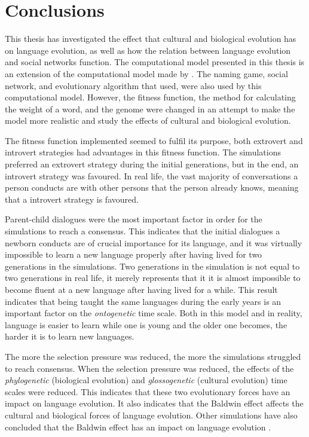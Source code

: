 \acresetall
\chapter{Conclusions}\label{ch:Conclusion}

This thesis has investigated the effect that cultural and biological evolution has on language evolution, as well as how the relation between language evolution and social networks function. The computational model presented in this thesis is an extension of the computational model made by \citet{lekvam2014co}. The naming game, social network, and evolutionary algorithm that \citeauthor{lekvam2014co} used, were also used by this computational model. However, the fitness function, the method for calculating the weight of a word, and the genome were changed in an attempt to make the model more realistic and study the effects of cultural and biological evolution.
 
The fitness function implemented seemed to fulfil its purpose, both extrovert and introvert strategies had advantages in this fitness function. The simulations preferred an extrovert strategy during the initial generations, but in the end, an introvert strategy was favoured. In real life, the vast majority of conversations a person conducts are with other persons that the person already knows, meaning that a introvert strategy is favoured.
 
Parent-child dialogues were the most important factor in order for the simulations to reach a consensus. This indicates that the initial dialogues a newborn conducts are of crucial importance for its language, and it was virtually impossible to learn a new language properly after having lived for two generations in the simulations. Two generations in the simulation is not equal to two generations in real life, it merely represents that it it is almost impossible to become fluent at a new language after having lived for a while. This result indicates that being taught the same languages during the early years is an important factor on the \textit{ontogenetic} time scale. Both in this model and in reality, language is easier to learn while one is young and the older one becomes, the harder it is to learn new languages.
 
The more the selection pressure was reduced, the more the simulations struggled to reach consensus. When the selection pressure was reduced, the effects of the \textit{phylogenetic} (biological evolution) and \textit{glossogenetic} (cultural evolution) time scales were reduced. This indicates that these two evolutionary forces have an impact on language evolution. It also indicates that the Baldwin effect \citep{baldwin1896new} affects the cultural and biological forces of language evolution. Other simulations have also concluded that the Baldwin effect has an impact on language evolution \citep{lipowska2011naming, zollman2010plasticity, chater2010language}.

